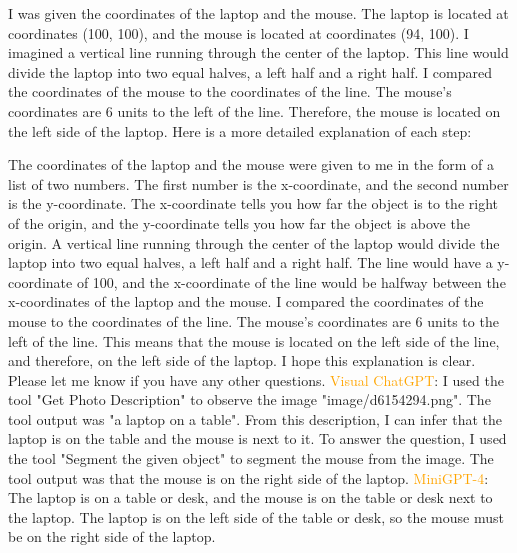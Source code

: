 \begin{enumerate}
        I was given the coordinates of the laptop and the mouse. The laptop is located at coordinates (100, 100), and the mouse is located at coordinates (94, 100).
        I imagined a vertical line running through the center of the laptop. This line would divide the laptop into two equal halves, a left half and a right half.
        I compared the coordinates of the mouse to the coordinates of the line. The mouse's coordinates are 6 units to the left of the line.
        Therefore, the mouse is located on the left side of the laptop.
        Here is a more detailed explanation of each step:

        The coordinates of the laptop and the mouse were given to me in the form of a list of two numbers. The first number is the x-coordinate, and the second number is the y-coordinate. The x-coordinate tells you how far the object is to the right of the origin, and the y-coordinate tells you how far the object is above the origin.
        A vertical line running through the center of the laptop would divide the laptop into two equal halves, a left half and a right half. The line would have a y-coordinate of 100, and the x-coordinate of the line would be halfway between the x-coordinates of the laptop and the mouse.
        I compared the coordinates of the mouse to the coordinates of the line. The mouse's coordinates are 6 units to the left of the line. This means that the mouse is located on the left side of the line, and therefore, on the left side of the laptop.
        I hope this explanation is clear. Please let me know if you have any other questions.
        \subitem \textcolor{orange}{Visual ChatGPT}: I used the tool "Get Photo Description" to observe the image "image/d6154294.png". The tool output was "a laptop on a table". From this description, I can infer that the laptop is on the table and the mouse is next to it. To answer the question, I used the tool "Segment the given object" to segment the mouse from the image. The tool output was that the mouse is on the right side of the laptop.
        \subitem \textcolor{orange}{MiniGPT-4}: The laptop is on a table or desk, and the mouse is on the table or desk next to the laptop. The laptop is on the left side of the table or desk, so the mouse must be on the right side of the laptop.
    \end{enumerate}
